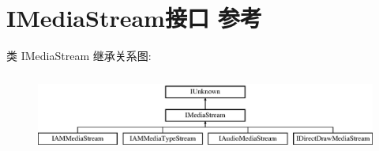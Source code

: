 \hypertarget{interface_i_media_stream}{}\section{I\+Media\+Stream接口 参考}
\label{interface_i_media_stream}
类 I\+Media\+Stream 继承关系图\+:\begin{figure}[H]
\begin{center}
\leavevmode
\includegraphics[height=2.608696cm]{interface_i_media_stream}
\end{center}
\end{figure}

